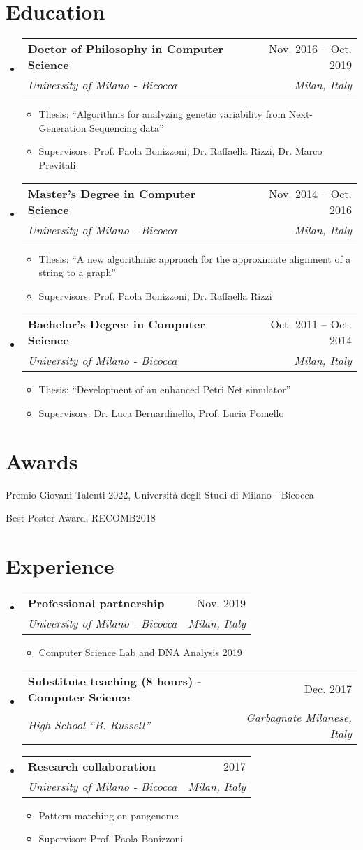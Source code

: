\documentclass[letterpaper,11pt]{article}
\makeatletter
\newcommand{\resumeItem}[1]{
  \item\small{
    {#1 \vspace{-2pt}}
  }
}
\newcommand{\resumeSubheading}[4]{
  \vspace{-2pt}\item
    \begin{tabular*}{0.97\textwidth}[t]{l@{\extracolsep{\fill}}r}
      \textbf{#1} & #2 \\
      \textit{\small#3} & \textit{\small #4} \\
    \end{tabular*}\vspace{-7pt}
}
\newcommand{\resumeSubHeadingListStart}{\begin{itemize}[leftmargin=0.15in, label={}]}
\newcommand{\resumeSubHeadingListEnd}{\end{itemize}}
\newcommand{\resumeItemListStart}{\begin{itemize}}
\newcommand{\resumeItemListEnd}{\end{itemize}\vspace{-5pt}}
\makeatother
\begin{document}
\section{Education}
  \resumeSubHeadingListStart
    \resumeSubheading
      {Doctor of Philosophy in Computer Science}{Nov. 2016 -- Oct. 2019}
      {University of Milano - Bicocca}{Milan, Italy}
      \resumeItemListStart
      \resumeItem{Thesis: ``Algorithms for analyzing genetic variability from Next-Generation Sequencing data''}
      \resumeItem{Supervisors: Prof. Paola Bonizzoni, Dr. Raffaella Rizzi, Dr. Marco Previtali}
      \resumeItemListEnd
    \resumeSubheading
      {Master's Degree in Computer Science}{Nov. 2014 -- Oct. 2016}
      {University of Milano - Bicocca}{Milan, Italy}
      \resumeItemListStart
      \resumeItem{Thesis: ``A new algorithmic approach for the approximate alignment of a string to a graph''}
      \resumeItem{Supervisors: Prof. Paola Bonizzoni, Dr. Raffaella Rizzi}
      \resumeItemListEnd
    \resumeSubheading
      {Bachelor's Degree in Computer Science}{Oct. 2011 -- Oct. 2014}
      {University of Milano - Bicocca}{Milan, Italy}
      \resumeItemListStart
      \resumeItem{Thesis: ``Development of an enhanced Petri Net simulator''}
      \resumeItem{Supervisors: Dr. Luca Bernardinello, Prof. Lucia Pomello}
      \resumeItemListEnd
  \resumeSubHeadingListEnd

\section{Awards}
 \begin{itemize}
    \small{
        \item Premio Giovani Talenti 2022, Università degli Studi di Milano - Bicocca
        \item Best Poster Award, RECOMB2018
    }
 \end{itemize}

\section{Experience}
  \resumeSubHeadingListStart
    \resumeSubheading
      {Professional partnership}{Nov. 2019}
      {University of Milano - Bicocca}{Milan, Italy}
      \resumeItemListStart
        \resumeItem{Computer Science Lab and DNA Analysis 2019}
      \resumeItemListEnd
    \resumeSubheading
      {Substitute teaching (8 hours) - Computer Science}{Dec. 2017}
      {High School ``B. Russell''}{Garbagnate Milanese, Italy}
    \resumeSubheading
      {Research collaboration}{2017}
      {University of Milano - Bicocca}{Milan, Italy}
      \resumeItemListStart
        \resumeItem{Pattern matching on pangenome}
        \resumeItem{Supervisor: Prof. Paola Bonizzoni}
      \resumeItemListEnd
  \resumeSubHeadingListEnd
\end{document}

